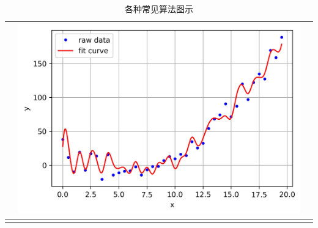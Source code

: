 \begin{longtable}[]{ccc}
\begin{minipage}{0.1\linewidth}
\end{minipage}
&
\begin{minipage}{0.1\linewidth}
\includegraphics[width=1.0\linewidth]{./img/ch2/sec1/3.jpg}
\end{minipage}
\tabularnewline
\bottomrule
\caption{各种常见算法图示}
\end{longtable}

